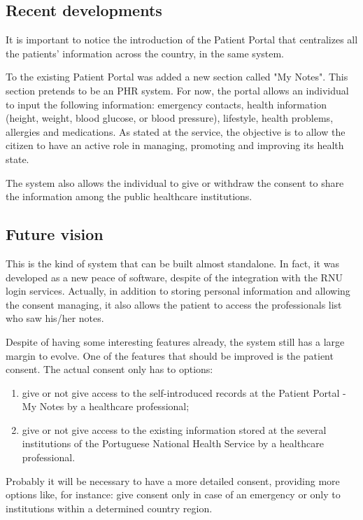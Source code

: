 \subsection{Recent developments}

It is important to notice the introduction of the Patient Portal that centralizes all the patients' information across the country, in the same system.

To the existing Patient Portal was added a new section called "My Notes". This section pretends to be an PHR system. For now, the portal allows an individual to input the following information: emergency contacts, health information (height, weight, blood glucose, or blood pressure), lifestyle, health problems, allergies and medications. As stated at the service, the objective is to allow the citizen to have an active role in managing, promoting and improving its health state.

The system also allows the individual to give or withdraw the consent to share the information among the public healthcare institutions.

\subsection{Future vision}
This is the kind of system that can be built almost standalone. In fact, it was developed as a new peace of software, despite of the integration with the RNU login services. Actually, in addition to storing personal information and allowing the consent managing, it also allows the patient to access the professionals list who saw his/her notes.

Despite of having some interesting features already, the system still has a large margin to evolve. One of the features that should be improved is the patient consent. The actual consent only has to options:
\begin{enumerate}
\item give or not give access to the self-introduced records at the Patient Portal - My Notes by a healthcare professional;
\item give or not give access to the existing information stored at the several institutions of the Portuguese National Health Service by a healthcare professional.
\end{enumerate}

Probably it will be necessary to have a more detailed consent, providing more options like, for instance: give consent only in case of an emergency or only to institutions within a determined country region.

